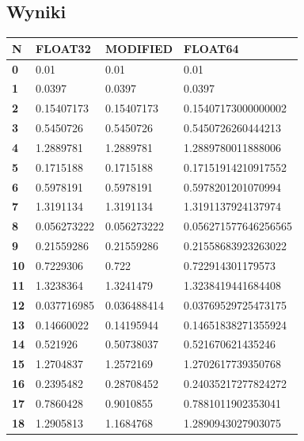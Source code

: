 \documentclass{article}
\begin{document}
    \subsection{Wyniki}
\begin{table}[H]
    \centering
    \begin{tabular}{|l|l|l|l|}
    \hline
        \textbf{N} & \textbf{FLOAT32} & \textbf{MODIFIED} & \textbf{FLOAT64} \\ \hline
        \textbf{0} & 0.01 & 0.01 & 0.01 \\ \hline
        \textbf{1} & 0.0397 & 0.0397 & 0.0397 \\ \hline
        \textbf{2} & 0.15407173 & 0.15407173 & 0.15407173000000002 \\ \hline
        \textbf{3} & 0.5450726 & 0.5450726 & 0.5450726260444213 \\ \hline
        \textbf{4} & 1.2889781 & 1.2889781 & 1.2889780011888006 \\ \hline
        \textbf{5} & 0.1715188 & 0.1715188 & 0.17151914210917552 \\ \hline
        \textbf{6} & 0.5978191 & 0.5978191 & 0.5978201201070994 \\ \hline
        \textbf{7} & 1.3191134 & 1.3191134 & 1.3191137924137974 \\ \hline
        \textbf{8} & 0.056273222 & 0.056273222 & 0.056271577646256565 \\ \hline
        \textbf{9} & 0.21559286 & 0.21559286 & 0.21558683923263022 \\ \hline\hline
        \textbf{10} & 0.7229306 & 0.722 & 0.722914301179573 \\ \hline\hline
        \textbf{11} & 1.3238364 & 1.3241479 & 1.3238419441684408 \\ \hline
        \textbf{12} & 0.037716985 & 0.036488414 & 0.03769529725473175 \\ \hline
        \textbf{13} & 0.14660022 & 0.14195944 & 0.14651838271355924 \\ \hline
        \textbf{14} & 0.521926 & 0.50738037 & 0.521670621435246 \\ \hline
        \textbf{15} & 1.2704837 & 1.2572169 & 1.2702617739350768 \\ \hline
        \textbf{16} & 0.2395482 & 0.28708452 & 0.24035217277824272 \\ \hline
        \textbf{17} & 0.7860428 & 0.9010855 & 0.7881011902353041 \\ \hline
        \textbf{18} & 1.2905813 & 1.1684768 & 1.2890943027903075 \\ \hline

\end{tabular}
\end{table}
\end{document}
